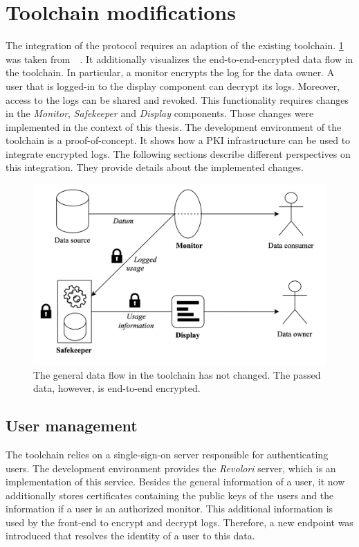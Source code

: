 \documentclass[../main.tex]{subfiles}
\begin{document}
\section{Toolchain modifications}
\label{sec:toolchain-modifications}
The integration of the protocol requires an adaption of the existing toolchain.
\cref{fig:encrypted-toolchain} was taken from~\citeauthor{Zieglmeier2021}~\cite{Zieglmeier2021}.
It additionally visualizes the end-to-end-encrypted data flow in the toolchain.
In particular, a monitor encrypts the log for the data owner.
A user that is logged-in to the display component can decrypt its logs.
Moreover, access to the logs can be shared and revoked.
This functionality requires changes in the \emph{Monitor}, \emph{Safekeeper} and \emph{Display} components.
Those changes were implemented in the context of this thesis.
The development environment of the toolchain is a proof-of-concept.
It shows how a PKI infrastructure can be used to integrate encrypted logs.
The following sections describe different perspectives on this integration.
They provide details about the implemented changes.


\begin{figure}[h!]
    \includegraphics[scale=0.16]{../img/06/encrypted_toolchain.png}
    \centering
    \caption[Toolchain encrypted data flow]{The general data flow in the toolchain has not changed. The passed data, however, is end-to-end encrypted.}
    \label{fig:encrypted-toolchain}
\end{figure}

\subsection{User management}
The toolchain relies on a single-sign-on server responsible for authenticating users.
The development environment provides the \emph{Revolori} server, which is an implementation of this service.
Besides the general information of a user, it now additionally stores certificates containing the public keys of the users and the information if a user is an authorized monitor.
This additional information is used by the front-end to encrypt and decrypt logs.
Therefore, a new endpoint was introduced that resolves the identity of a user to this data.
\end{document}
